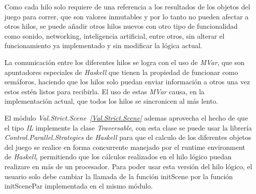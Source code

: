 Como cada hilo solo requiere de una referencia a los resultados de los objetos del juego para correr, que son valores inmutables y por lo tanto no pueden afectar a otros hilos, se puede añadir otros hilos nuevos con otro tipo de funcionalidad como sonido, networking, inteligencia artificial, entre otros, sin alterar el funcionamiento ya implementado y sin modificar la lógica actual.

La comunicación entre los diferentes hilos se logra con el uso de \emph{MVar}, que son apuntadores especiales de \emph{Haskell} que tienen la propiedad de funcionar como semáforos, haciendo que los hilos solo puedan enviar información a otros una vez estos estén listos para recibirla. El uso de estas \emph{MVar} causa, en la implementación actual, que todos los hilos se sincronicen al más lento.

El módulo \emph{Val.Strict.Scene~\ref{Val.Strict.Scene}} ademas aprovecha el hecho de que el tipo \emph{IL} implemente la clase \emph{Traversable}, con esta clase se puede usar la librería \emph{Control.Parallel.Strategies} de \emph{Haskell} para que el calculo de los diferentes objetos del juego se realice en forma concurrente manejado por el runtime environment de \emph{Haskell}, permitiendo que los cálculos realizados en el hilo lógico puedan realizare en más de un procesador. Para poder usar esta versión del hilo lógico, el usuario solo debe cambiar la llamada de la función initScene por la función initScenePar implementada en el mismo módulo.

